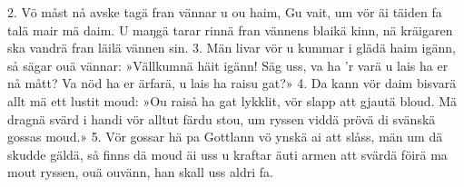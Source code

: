 2.  Vö måst nå avske tagä fran vännar u ou haim,
    Gu vait, um vör äi täiden fa talä mair mä daim.
    U maŋgä tarar rinnä fran vännens blaikä kinn,
    nä kräigaren ska vandrä fran läilä vännen sin.
3.  Män livar vör u kummar i glädä haim igänn,
    så sägar ouä vännar: »Vällkumnä häit igänn!
    Säg uss, va ha ’r varä u lais ha er nå mått?
    Va nöd ha er ärfarä, u lais ha raisu gat?»
4.  Da kann vör daim bisvarä allt mä ett lustit moud:
    »Ou raiså ha gat lykklit, vör slapp att gjautä bloud.
    Mä dragnä svärd i handi vör alltut färdu stou,
    um ryssen viddä prövä di svänskä gossas moud.»
5.  Vör gossar hä pa Gottlann vö ynskä ai att slåss,
    män um dä skudde gäldä, så finns dä moud äi uss
    u kraftar äuti armen att svärdä föirä ma
    mout ryssen, ouä ouvänn, han skall uss aldri fa.

